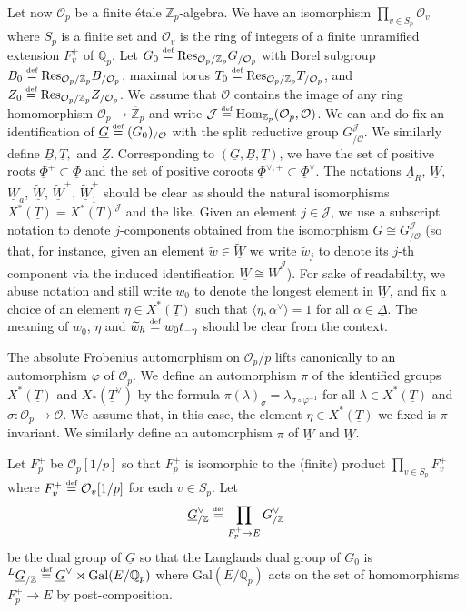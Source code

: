 \documentclass[oneside,a4paper,english, 11pt]{amsart}
\theoremstyle{plain}
\theoremstyle{plain}
\theoremstyle{plain}
\theoremstyle{plain}
\theoremstyle{plain}
\theoremstyle{plain}
\theoremstyle{definition}
\theoremstyle{definition}
\theoremstyle{definition}
\theoremstyle{remark}
\numberwithin{equation}{section}
\newcommand{\Z}{\mathbb{Z}}
\newcommand{\Q}{\mathbb{Q}}
\newcommand{\cJ}{\mathcal{J}}
\newcommand{\cO}{\mathcal{O}}
\newcommand{\Zp}{\mathbb{Z}_p}
\newcommand{\Gal}{\mathrm{Gal}}
\newcommand{\Hom}{\mathrm{Hom}}
\newcommand{\Res}{\mathrm{Res}}
\newcommand{\un}[1]{\underline{#1}}
\newcommand{\tld}[1]{\widetilde{#1}}
\newcommand{\defeq}{\stackrel{\textrm{\tiny{def}}}{=}}
\newcommand{\ovl}[1]{\overline{#1}}
\newcommand{\ra}{\rightarrow}
\begin{document}
Let now $\cO_p$ be a finite \'etale $\Z_p$-algebra.
We have an isomorphism $\prod\limits_{v\in S_p} \cO_{v}$ where $S_p$ is a finite set and $\cO_{v}$ is the ring of integers of a finite unramified extension $F^+_{v}$ of $\Q_p$.
Let $G_0 \defeq \Res_{\cO_p/\Z_p} G_{/\cO_p}$ with Borel subgroup $B_0 \defeq  \Res_{\cO_p/\Z_p} B_{/\cO_p}$, maximal torus $T_0 \defeq \Res_{\cO_p/\Z_p} T_{/\cO_p}$, and $Z_0 \defeq \Res_{\cO_p/\Z_p} Z_{/\cO_p}$. 
We assume that $\cO$ contains the image of any ring homomorphism $\cO_p \ra \ovl{\Z}_p$ and write $\cJ\defeq \Hom_{\Zp}(\cO_p,\cO)$.
We can and do fix an identification of $\un{G} \defeq (G_0)_{/\cO}$ with the split reductive group $G_{/\cO}^{\cJ}$. 
We similarly define $\un{B}, \un{T},$ and $\un{Z}$.
Corresponding to $(\un{G}, \un{B}, \un{T})$, we have the set of positive roots $\un{\Phi}^+ \subset \un{\Phi}$ and the set of positive coroots $\un{\Phi}^{\vee, +}\subset \un{\Phi}^{\vee}$.
The notations $\un{\Lambda}_R$, $\un{W}$, $\un{W}_a$, $\tld{\un{W}}$, $\tld{\un{W}}^+$, $\tld{\un{W}}^+_1$ should be clear as should the natural isomorphisms $X^*(\un{T}) = X^*(T)^{\cJ}$ and the like.  
Given an element $j\in\cJ$, we use a subscript notation to denote $j$-components obtained from the isomorphism $\un{G}\cong G_{/\cO}^{\cJ}$ (so that, for instance, given an element $\tld{w}\in \tld{\un{W}}$ we write $\tld{w}_j$ to denote its $j$-th component via the induced identification $\tld{\un{W}}\cong \tld{W}^{\cJ}$).
For sake of readability, we abuse notation and still write $w_0$ to denote the longest element in $\un{W}$, and fix a choice of an element $\eta\in X^*(\un{T})$ such that $\langle \eta,\alpha^\vee\rangle = 1$ for all $\alpha\in\un{\Delta}$.
The meaning of $w_0$, $\eta$ and $\tld{w}_h\defeq w_0t_{-\eta}$ should be clear from the context.



The absolute Frobenius automorphism on $\cO_p/p$ lifts canonically to an automorphism $\varphi$ of $\cO_p$. We define an automorphism $\pi$ of the identified groups $X^*(\un{T})$ and $X_*(\un{T}^\vee)$ by the formula $\pi(\lambda)_\sigma = \lambda_{\sigma \circ \varphi^{-1}}$ for all $\lambda\in X^*(\un{T})$ and $\sigma: \cO_p \ra \cO$.
We assume that, in this case, the element $\eta\in X^*(\un{T})$ we fixed is $\pi$-invariant.
We similarly define an automorphism $\pi$ of $\un{W}$ and $\tld{\un{W}}$.


Let $F^+_p$ be $\cO_p[1/p]$ so that $F^+_p$ is isomorphic to the (finite) product $\prod\limits_{v \in S_p} F^+_{v}$ where $F^+_{v} \defeq \cO_{v}[1/p]$ for each $v \in S_p$.
Let 
\[
\un{G}^\vee_{/\Z} \defeq \prod_{F^+_p \ra E} G^\vee_{/\Z} 
\]
be the dual group of $\un{G}$ so that the Langlands dual group of $G_0$ is $^L \un{G}_{/\Z} \defeq \un{G}^\vee\rtimes \Gal(E/\Q_p)$ where $\Gal(E/\Q_p)$ acts on the set of homomorphisms $F^+_p \ra E$ by post-composition.
\end{document}

